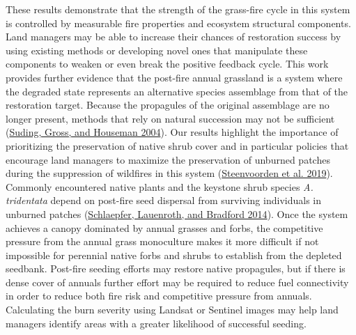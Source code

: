 \documentclass[
  12pt,
]{article}
\begin{document}
These results demonstrate that the strength of the grass-fire cycle in
this system is controlled by measurable fire properties and ecosystem
structural components. Land managers may be able to increase their
chances of restoration success by using existing methods or developing
novel ones that manipulate these components to weaken or even break the
positive feedback cycle. This work provides further evidence that the
post-fire annual grassland is a system where the degraded state
represents an alternative species assemblage from that of the
restoration target. Because the propagules of the original assemblage
are no longer present, methods that rely on natural succession may not
be sufficient (\protect\hyperlink{ref-Suding2004}{Suding, Gross, and
Houseman 2004}). Our results highlight the importance of prioritizing
the preservation of native shrub cover and in particular policies that
encourage land managers to maximize the preservation of unburned patches
during the suppression of wildfires in this system
(\protect\hyperlink{ref-Steenvoorden2019}{Steenvoorden et al. 2019}).
Commonly encountered native plants and the keystone shrub species
\emph{A. tridentata} depend on post-fire seed dispersal from surviving
individuals in unburned patches
(\protect\hyperlink{ref-Schlaepfer2014}{Schlaepfer, Lauenroth, and
Bradford 2014}). Once the system achieves a canopy dominated by annual
grasses and forbs, the competitive pressure from the annual grass
monoculture makes it more difficult if not impossible for perennial
native forbs and shrubs to establish from the depleted seedbank.
Post-fire seeding efforts may restore native propagules, but if there is
dense cover of annuals further effort may be required to reduce fuel
connectivity in order to reduce both fire risk and competitive pressure
from annuals. Calculating the burn severity using Landsat or Sentinel
images may help land managers identify areas with a greater likelihood
of successful seeding.
\end{document}
